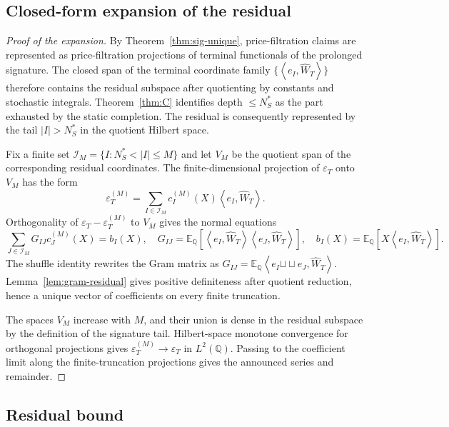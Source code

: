 \documentclass[11pt,oneside]{article}
\theoremstyle{plain}
\theoremstyle{definition}
\theoremstyle{remark}
\newcommand{\E}{\mathbb{E}}
\newcommand{\Q}{\mathbb{Q}}
\newcommand{\cW}{\widehat W}
\newcommand{\sh}{\mathbin{\sqcup\!\sqcup}}
\newcommand{\inner}[2]{\left\langle #1,#2\right\rangle}
\begin{document}
\subsection{Closed-form expansion of the residual}

\begin{proof}[Proof of the expansion]
By Theorem~\ref{thm:sig-unique}, price-filtration claims are represented as price-filtration projections of terminal functionals of the prolonged signature. The closed span of the terminal coordinate family $\{\inner{e_I}{\cW_T}\}$ therefore contains the residual subspace after quotienting by constants and stochastic integrals. Theorem~\ref{thm:C} identifies depth $\leq N_S^\ast$ as the part exhausted by the static completion. The residual is consequently represented by the tail $|I|>N_S^\ast$ in the quotient Hilbert space.

Fix a finite set $\mathcal I_M=\{I:N_S^\ast<|I|\leq M\}$ and let $V_M$ be the quotient span of the corresponding residual coordinates. The finite-dimensional projection of $\varepsilon_T$ onto $V_M$ has the form
\[
\varepsilon_T^{(M)}=\sum_{I\in\mathcal I_M}c_I^{(M)}(X)\inner{e_I}{\cW_T}.
\]
Orthogonality of $\varepsilon_T-\varepsilon_T^{(M)}$ to $V_M$ gives the normal equations
\[
\sum_{J\in\mathcal I_M}G_{IJ}c_J^{(M)}(X)=b_I(X),
\quad
G_{IJ}=\E_\Q\left[\inner{e_I}{\cW_T}\inner{e_J}{\cW_T}\right],
\quad
b_I(X)=\E_\Q\left[X\inner{e_I}{\cW_T}\right].
\]
The shuffle identity rewrites the Gram matrix as $G_{IJ}=\E_\Q\inner{e_I\sh e_J}{\cW_T}$. Lemma~\ref{lem:gram-residual} gives positive definiteness after quotient reduction, hence a unique vector of coefficients on every finite truncation.

The spaces $V_M$ increase with $M$, and their union is dense in the residual subspace by the definition of the signature tail. Hilbert-space monotone convergence for orthogonal projections gives $\varepsilon_T^{(M)}\to\varepsilon_T$ in $L^2(\Q)$. Passing to the coefficient limit along the finite-truncation projections gives the announced series and remainder.
\end{proof}

\subsection{Residual bound}
\label{subsec:residual-bound}
\end{document}
